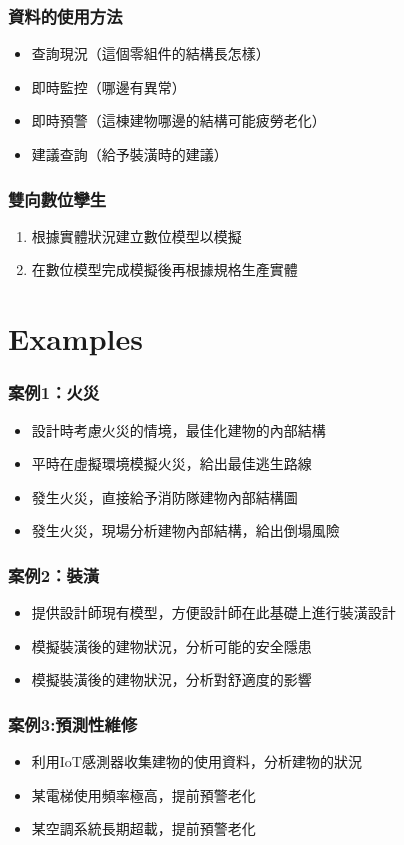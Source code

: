 \documentclass[xcolor=dvipsnames]{beamer}
\begin{document}
    \begin{frame}
        \frametitle{資料的使用方法}
        \begin{itemize}
            \item 查詢現況（這個零組件的結構長怎樣）
            \item 即時監控（哪邊有異常）
            \item 即時預警（這棟建物哪邊的結構可能疲勞老化）
            \item 建議查詢（給予裝潢時的建議）
        \end{itemize}
    \end{frame}
    \begin{frame}
        \frametitle{雙向數位孿生}
        \begin{enumerate}
            \item 根據實體狀況建立數位模型以模擬
            \item 在數位模型完成模擬後再根據規格生產實體
        \end{enumerate}
    \end{frame}

    \section{Examples}
    \begin{frame}
        \frametitle{案例1：火災}
        \begin{itemize}
            \item 設計時考慮火災的情境，最佳化建物的內部結構
            \item 平時在虛擬環境模擬火災，給出最佳逃生路線
            \item 發生火災，直接給予消防隊建物內部結構圖
            \item 發生火災，現場分析建物內部結構，給出倒塌風險
        \end{itemize}
    \end{frame}
    \begin{frame}
        \frametitle{案例2：裝潢}
        \begin{itemize}
            \item 提供設計師現有模型，方便設計師在此基礎上進行裝潢設計
            \item 模擬裝潢後的建物狀況，分析可能的安全隱患
            \item 模擬裝潢後的建物狀況，分析對舒適度的影響
        \end{itemize}
    \end{frame}
    \begin{frame}
        \frametitle{案例3:預測性維修}
        \begin{itemize}
            \item 利用IoT感測器收集建物的使用資料，分析建物的狀況
            \item 某電梯使用頻率極高，提前預警老化
            \item 某空調系統長期超載，提前預警老化
        \end{itemize}
    \end{frame}
\end{document}
